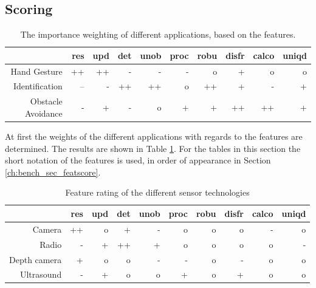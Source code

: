 \subsection{Scoring}
\begin{table}[htbp]
  \centering
  \caption{The importance weighting of different applications, based on the features.}
    \begin{tabular}{rrrrrrrrrr}
    \toprule
          & res   & upd   & det   & unob  & proc  & robu  & disfr & calco & uniqd \\
    \midrule
    Hand Gesture & ++    & ++    & -     & -     & -     & o     & +     & o     & o \\
    Identification & --    & -     & ++    & ++    & o     & ++    & +     & -     & + \\
    Obstacle Avoidance & -     & +     & -     & o     & +     & +     & ++    & ++    & + \\
    \bottomrule
    \end{tabular}%
  \label{tab:bench_appweights}%
\end{table}%
At first the weights of the different applications with regards to the features are determined. The results are shown in Table \ref{tab:bench_appweights}. For the tables in this section the short notation of the features is used, in order of appearance in Section \ref{ch:bench_sec_featscore}.
\begin{table}[htbp]
  \centering
  \caption{Feature rating of the different sensor technologies}
    \begin{tabular}{rrrrrrrrrr}
    \toprule
          & res   & upd   & det   & unob  & proc  & robu  & disfr & calco & uniqd \\
    \midrule
    Camera & ++    & o     & +     & -     & o     & o     & o     & -     & o \\
    Radio & -     & +     & ++    & +     & o     & o     & o     & o     & - \\
    Depth camera & +     & o     & o     & -     & -     & o     & -     & o     & o \\
    Ultrasound & -     & +     & o     & o     & +     & o     & +     & o     & o \\
    \bottomrule
    \end{tabular}
  \label{tab:bench_feature_rating}
\end{table}
